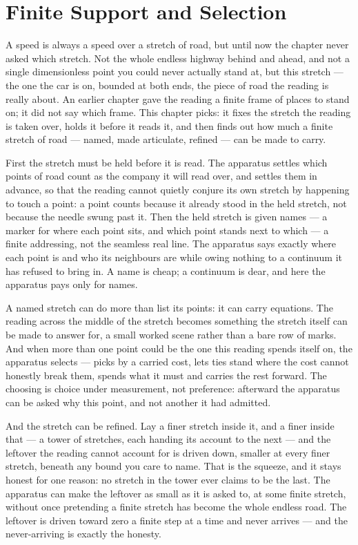 \chapter{Finite Support and Selection}

A speed is always a speed over a stretch of road, but until now the chapter never asked which stretch. Not the whole endless highway behind and ahead, and not a single dimensionless point you could never actually stand at, but this stretch --- the one the car is on, bounded at both ends, the piece of road the reading is really about. An earlier chapter gave the reading a finite frame of places to stand on; it did not say which frame. This chapter picks: it fixes the stretch the reading is taken over, holds it before it reads it, and then finds out how much a finite stretch of road --- named, made articulate, refined --- can be made to carry.

First the stretch must be held before it is read. The apparatus settles which points of road count as the company it will read over, and settles them in advance, so that the reading cannot quietly conjure its own stretch by happening to touch a point: a point counts because it already stood in the held stretch, not because the needle swung past it. Then the held stretch is given names --- a marker for where each point sits, and which point stands next to which --- a finite addressing, not the seamless real line. The apparatus says exactly where each point is and who its neighbours are while owing nothing to a continuum it has refused to bring in. A name is cheap; a continuum is dear, and here the apparatus pays only for names.

A named stretch can do more than list its points: it can carry equations. The reading across the middle of the stretch becomes something the stretch itself can be made to answer for, a small worked scene rather than a bare row of marks. And when more than one point could be the one this reading spends itself on, the apparatus selects --- picks by a carried cost, lets ties stand where the cost cannot honestly break them, spends what it must and carries the rest forward. The choosing is choice under measurement, not preference: afterward the apparatus can be asked why this point, and not another it had admitted.

And the stretch can be refined. Lay a finer stretch inside it, and a finer inside that --- a tower of stretches, each handing its account to the next --- and the leftover the reading cannot account for is driven down, smaller at every finer stretch, beneath any bound you care to name. That is the squeeze, and it stays honest for one reason: no stretch in the tower ever claims to be the last. The apparatus can make the leftover as small as it is asked to, at some finite stretch, without once pretending a finite stretch has become the whole endless road. The leftover is driven toward zero a finite step at a time and never arrives --- and the never-arriving is exactly the honesty.

